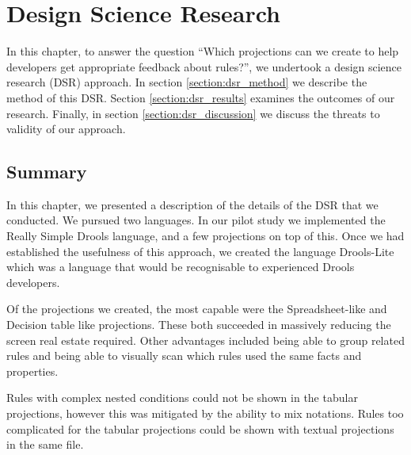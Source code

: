 \chapter{Design Science Research}
\label{chapter:DSR}

In this chapter, to answer the question ``Which projections can we create to help developers get appropriate feedback about rules?'', we undertook a design science research (DSR) approach.
In section \ref{section:dsr_method} we describe the method of this DSR.
Section \ref{section:dsr_results} examines the outcomes of our research.
Finally, in section \ref{section:dsr_discussion} we discuss the threats to validity of our approach.







\section{Summary}
In this chapter, we presented a description of the details of the DSR that we conducted.
We pursued two languages.
In our pilot study we implemented the Really Simple Drools language, and a few projections on top of this.
Once we had established the usefulness of this approach, we created the language Drools-Lite which was a language that would be recognisable to experienced Drools developers.

Of the projections we created, the most capable were the Spreadsheet-like and Decision table like projections.
These both succeeded in massively reducing the screen real estate required.
Other advantages included being able to group related rules and being able to visually scan which rules used the same facts and properties.

Rules with complex nested conditions could not be shown in the tabular projections, however this was mitigated by the ability to mix notations.
Rules too complicated for the tabular projections could be shown with textual projections in the same file.
